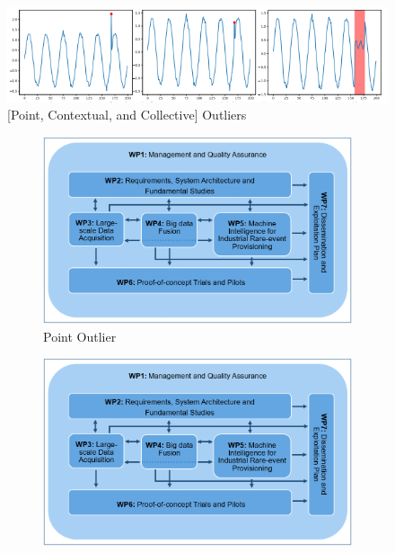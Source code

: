 \begin{figure}[H]
    \includegraphics[width=\textwidth]{Images/outliers_graphic.PNG}
    \caption{[Point, Contextual, and Collective] Outliers \parencite{lai2021revisiting}}
    \label{fig:outliers-graphic}
\end{figure}

\begin{figure}[H]
     \centering
     \begin{subfigure}[b]{0.3\textwidth}
         \centering
         \includegraphics[width=\textwidth]{Images/FIREMAN_pert_diagram.png}
         \caption{Point Outlier}
         \label{fig:shaplet}
     \end{subfigure}
     \hfill
     \begin{subfigure}[b]{0.3\textwidth}
         \centering
         \includegraphics[width=\textwidth]{Images/FIREMAN_pert_diagram.png}

\end{subfigure}
\end{figure}
